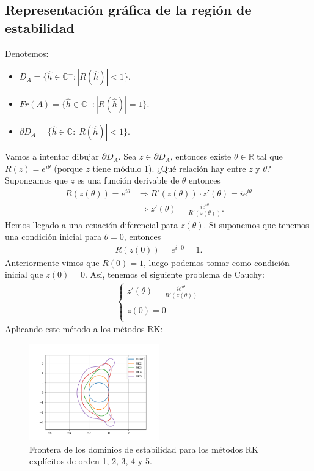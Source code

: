 \subsection{Representación gráfica de la región de estabilidad}
\noindent Denotemos:
\begin{itemize}
    \item $D_A = \{ \hat{h} \in \mathbb{C}^- : |R(\hat{h})| < 1\}$.
    \item $Fr(A) = \{ \hat{h} \in \mathbb{C}^- : |R(\hat{h})| = 1\}$.
    \item $\partial D_A = \{ \hat{h} \in \mathbb{C} : |R(\hat{h})| < 1\}$.
\end{itemize}
Vamos a intentar dibujar $\partial D_A$. Sea $z \in \partial D_A$, entonces existe $\theta \in \mathbb{R}$ tal que $R(z) = e^{i\theta}$ (porque $z$ tiene módulo 1). ¿Qué relación hay entre $z$ y $\theta$? Supongamos que $z$ es una función derivable de $\theta$  entonces
\begin{align*}
    R(z(\theta)) = e^{i\theta} &\Longrightarrow R'(z(\theta)) \cdot z'(\theta) = ie^{i\theta} \\
    &\Longrightarrow z'(\theta) = \frac{ie^{i\theta}}{R'(z(\theta))}.
\end{align*}
Hemos llegado a una ecuación diferencial para $z(\theta)$. Si suponemos que tenemos una condición inicial para $\theta = 0$, entonces
\begin{align*}
    R(z(0)) = e^{i \cdot 0} = 1.
\end{align*}
Anteriormente vimos que $R(0) = 1$, luego podemos tomar como condición inicial que $z(0) = 0$. Así, tenemos el siguiente problema de Cauchy:
\begin{align*}
    \left\{ \begin{array}{lcc}
             z'(\theta) = \frac{ie^{i\theta}}{R'(z(\theta))}\\
             \\ z(0) = 0\\
             \end{array}
   \right.
\end{align*}
Aplicando este método a los métodos RK:

\begin{figure}[H]
    \centering
    \includegraphics[width=0.5\textwidth]{imagenes/RK_explicitos.png}
    \caption*{Frontera de los dominios de estabilidad para los métodos RK explícitos de orden 1, 2, 3, 4 y 5.}
\end{figure}

